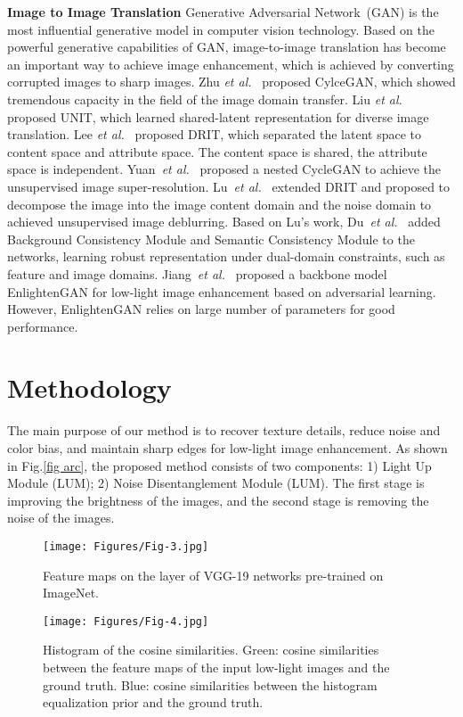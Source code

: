 \documentclass[journal]{IEEEtran}
\newcommand{\etal}{{\emph{et al.}}}
\begin{document}
\textbf{Image to Image Translation} Generative Adversarial Network~(GAN) is the most influential generative model in computer vision technology. Based on the powerful generative capabilities of GAN, image-to-image translation has become an important way to achieve image enhancement, which is achieved by converting corrupted images to sharp images. Zhu \etal~\cite{zhu2017unpaired} proposed CylceGAN, which showed tremendous capacity in the field of the image domain transfer. Liu \etal~\cite{liu2017unsupervised} proposed UNIT, which learned shared-latent representation for diverse image translation. Lee \etal~\cite{lee2018diverse} proposed DRIT, which separated the latent space to content space and attribute space. The content space is shared, the attribute space is independent. Yuan~\etal~\cite{yuan2018unsupervised} proposed a nested CycleGAN to achieve the unsupervised image super-resolution. Lu~\etal~\cite{lu2019unsupervised} extended DRIT and proposed to decompose the image into the image content domain and the noise domain to achieved unsupervised image deblurring. Based on Lu's work, Du~\etal~\cite{du2020learning} added Background Consistency Module and Semantic Consistency Module to the networks, learning robust representation under dual-domain constraints, such as feature and image domains. Jiang~\etal~\cite{jiang2021enlightengan} proposed a backbone model EnlightenGAN for low-light image enhancement based on adversarial learning. However, EnlightenGAN relies on large number of parameters for good performance.

\section{Methodology}
\label{method}
The main purpose of our method is to recover texture details, reduce noise and color bias, and maintain sharp edges for low-light image enhancement. As shown in Fig.\ref{fig arc}, the proposed method consists of two components: 1) Light Up Module (LUM); 2) Noise Disentanglement Module (LUM). The first stage is improving the brightness of the images, and the second stage is removing the noise of the images.
\begin{figure*}[htbp]
\centering
\texttt{[image: Figures/Fig-3.jpg]}
\caption{Feature maps on the  layer of VGG-19 networks pre-trained on ImageNet.}
\label{fig prior}
\end{figure*}
\begin{figure}[t]
\centering
 \texttt{[image: Figures/Fig-4.jpg]}
 \caption{Histogram of the cosine similarities. Green: cosine similarities between the feature maps of the input low-light images and the ground truth. Blue: cosine similarities between the histogram equalization prior and the ground truth.}
 \label{fig cos}
\end{figure}
\end{document}
